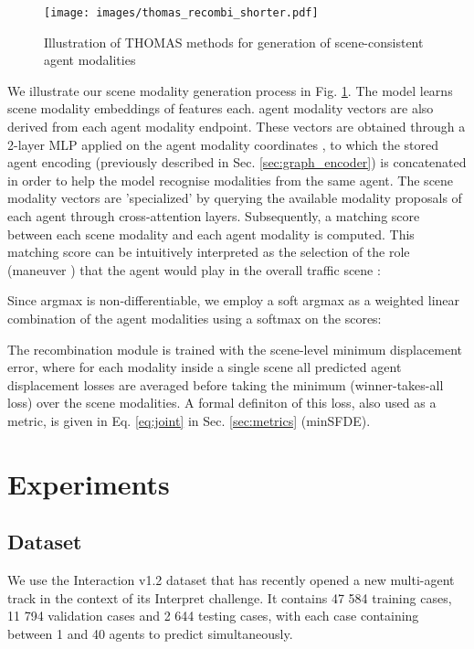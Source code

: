 \documentclass{article} \usepackage{iclr2022_conference,times}
\begin{document}
\begin{figure}[t]
\centerline{\texttt{[image: images/thomas\_recombi\_shorter.pdf]}}
\caption{Illustration of THOMAS methods for generation of scene-consistent agent modalities}
\label{fig:thomas}
\end{figure}

We illustrate our scene modality generation process in Fig. \ref{fig:thomas}. The model learns  scene modality embeddings  of  features each.  agent modality vectors  are also derived from each agent modality endpoint. These vectors are obtained through a 2-layer MLP applied on the agent modality coordinates  , to which the stored agent encoding  (previously described in Sec. \ref{sec:graph_encoder}) is concatenated in order to help the model recognise modalities from the same agent. The scene modality vectors  are 'specialized' by querying the available modality proposals  of each agent through cross-attention layers. Subsequently, a matching score  between each scene modality  and each agent modality  is computed. This matching score can be intuitively interpreted as the selection of the role (maneuver ) that the agent  would play in the overall traffic scene :

Since argmax is non-differentiable, we employ a soft argmax as a weighted linear combination of the agent modalities  using a softmax on the  scores:

The recombination module is trained with the scene-level minimum displacement error, where for each modality inside a single scene  all predicted agent displacement losses are averaged before taking the minimum (winner-takes-all loss) over the  scene modalities. A formal definiton of this loss, also used as a metric, is given in Eq. \ref{eq:joint} in Sec. \ref{sec:metrics} (minSFDE).


\section{Experiments}




\subsection{Dataset}

We use the Interaction v1.2 dataset that has recently opened a new multi-agent track in the context of its Interpret challenge. It contains 47 584 training cases, 11 794 validation cases and 2 644 testing cases, with each case containing between 1 and 40 agents to predict simultaneously.
\end{document}
